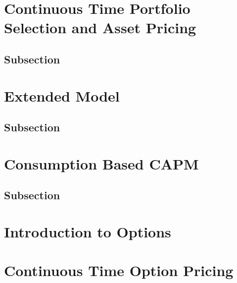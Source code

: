 \documentclass[
14pt,notheorems,hyperref={pdfauthor=whatever}
]{beamer}
\begin{document}
\section{Continuous Time Portfolio Selection and Asset Pricing}
\subsection{Subsection}

\section{Extended Model}
\subsection{Subsection}

\section{Consumption Based CAPM}
\subsection{Subsection}

\section{Introduction to Options}


\section{Continuous Time Option Pricing}
\end{document}
